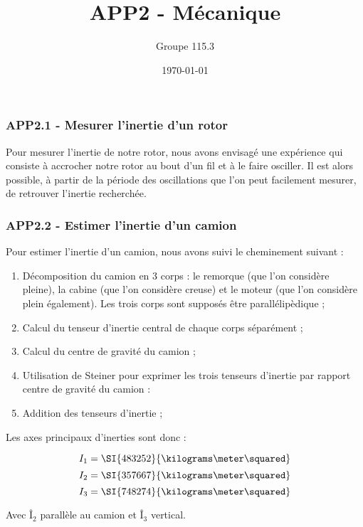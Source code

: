 \documentclass[pdf]{beamer}
\title{APP2 - Mécanique}
\author{Groupe 115.3}
\date{\today}
\begin{document}
\begin{frame}
	\titlepage
\end{frame}

\begin{frame}
	\frametitle{APP2.1 - Mesurer l'inertie d'un rotor}
	
	Pour mesurer l'inertie de notre rotor, nous avons envisagé une expérience
	qui consiste à accrocher notre rotor au bout d'un fil et à le faire osciller.
	Il est alors possible, à partir de la période des oscillations que l'on peut
	facilement mesurer, de retrouver l'inertie recherchée.
	
\end{frame}

\begin{frame}
	\frametitle{APP2.2 - Estimer l'inertie d'un camion}	

	Pour estimer l'inertie d'un camion, nous avons suivi le cheminement suivant :
	
	\begin{enumerate}
		\item Décomposition du camion en 3 corps : le remorque (que l'on considère
		pleine), la cabine (que l'on considère creuse) et le moteur (que l'on considère
		plein également). Les trois corps sont supposés être parallélipèdique ;
		\item Calcul du tenseur d'inertie central de chaque corps séparément ;
		\item Calcul du centre de gravité du camion ;
		\item Utilisation de Steiner pour exprimer les trois tenseurs d'inertie
		par rapport centre de gravité du camion :
		\item Addition des tenseurs d'inertie ;
	\end{enumerate}
	
	Les axes principaux d'inerties sont donc :
	
	$$I_1 = \SI{483252}{\kilograms\meter\squared}$$
	$$I_2 = \SI{357667}{\kilograms\meter\squared}$$
	$$I_3 = \SI{748274}{\kilograms\meter\squared}$$
	
	Avec $Î_2$ parallèle au camion et $Î_3$ vertical.
\end{frame}
\end{document}
